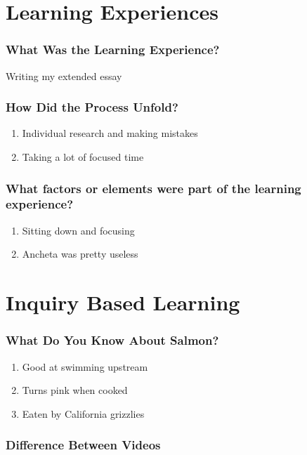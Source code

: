 \documentclass{notes}
\begin{document}
\section{Learning Experiences}

\subsubsection*{What Was the Learning Experience?}
Writing my extended essay

\subsubsection*{How Did the Process Unfold?}
\begin{enumerate}
    \item Individual research and making mistakes
    \item Taking a lot of focused time
\end{enumerate}

\subsubsection*{What factors or elements were part of the learning experience?}
\begin{enumerate}
    \item Sitting down and focusing
    \item Ancheta was pretty useless
\end{enumerate}

\section{Inquiry Based Learning}

\subsubsection*{What Do You Know About Salmon?}
\begin{enumerate}
    \item Good at swimming upstream
    \item Turns pink when cooked
    \item Eaten by California grizzlies
\end{enumerate}

\subsubsection*{Difference Between Videos}
\end{document}
